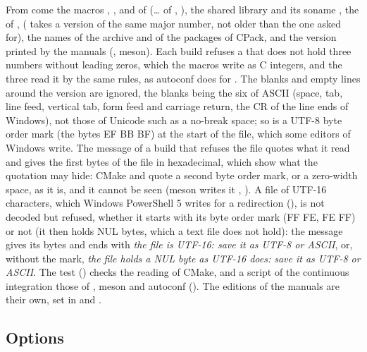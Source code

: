 \documentclass[12pt,a4paper,twoside,openright]{book}
\begin{document}
\noindent
From  come the macros ,
,  and
 of 
(\ldots{} of ,
), the shared library
 and its soname
, the  of ,
 (
takes a version of the same major number, not older than the one asked for),
the names of the archive and of the packages of CPack, and the version printed
by the manuals (, meson). Each build refuses a
 that does not hold three numbers without leading zeros,
which the macros write as C integers, and the three read it by the same
rules, as autoconf does for . The blanks and empty
lines around the version are ignored, the blanks being the six of ASCII
(space, tab, line feed, vertical tab, form feed and carriage return, the CR of
the line ends of Windows), not those of Unicode such as a no-break space; so
is a UTF-8 byte order mark (the bytes EF BB BF) at the start of the file,
which some editors of Windows write. The message of a build that refuses the
file quotes what it read and gives the first bytes of the file in
hexadecimal, which show what the quotation may hide: CMake and
 quote a second byte order mark, or a zero-width space, as it
is, and it cannot be seen (meson writes it ,
). A file of UTF-16 characters, which Windows
PowerShell 5 writes for a redirection (), is not
decoded but refused, whether it starts with its byte order mark (FF FE, FE FF)
or not (it then holds NUL bytes, which a text file does not hold): the message
gives its bytes and ends with \emph{the file is UTF-16: save it as UTF-8 or
ASCII}, or, without the mark, \emph{the file holds a NUL byte as UTF-16 does:
save it as UTF-8 or ASCII}. The test 
() checks the reading of CMake, and a script of
the continuous integration those of , meson and autoconf
(). The editions of the manuals are their own, set in
 and .

\subsection{Options}\label{sec:cmake-options}
\end{document}
